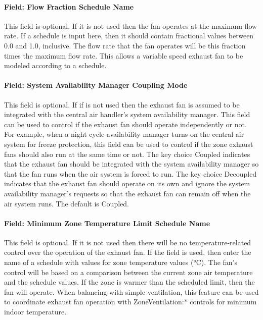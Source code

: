 \paragraph{Field: Flow Fraction Schedule Name}\label{field-flow-fraction-schedule-name}

This field is optional. If it is not used then the fan operates at the maximum flow rate. If a schedule is input here, then it should contain fractional values between 0.0 and 1.0, inclusive. The flow rate that the fan operates will be this fraction times the maximum flow rate. This allows a variable speed exhaust fan to be modeled according to a schedule.

\paragraph{Field: System Availability Manager Coupling Mode}\label{field-system-availability-manager-coupling-mode}

This field is optional. If if is not used then the exhaust fan is assumed to be integrated with the central air handler's system availability manager. This field can be used to control if the exhaust fan should operate independently or not. For example, when a night cycle availability manager turns on the central air system for freeze protection, this field can be used to control if the zone exhaust fans should also run at the same time or not. The key choice Coupled indicates that the exhaust fan should be integrated with the system availability manager so that the fan runs when the air system is forced to run. The key choice Decoupled indicates that the exhaust fan should operate on its own and ignore the system availability manager's requests so that the exhaust fan can remain off when the air system runs. The default is Coupled.

\paragraph{Field: Minimum Zone Temperature Limit Schedule Name}\label{field-minimum-zone-temperature-limit-schedule-name}

This field is optional. If it is not used then there will be no temperature-related control over the operation of the exhaust fan. If the field is used, then enter the name of a schedule with values for zone temperature values (°C). The fan's control will be based on a comparison between the current zone air temperature and the schedule values. If the zone is warmer than the scheduled limit, then the fan will operate. When balancing with simple ventilation, this feature can be used to coordinate exhaust fan operation with ZoneVentilation:* controls for minimum indoor temperature.

